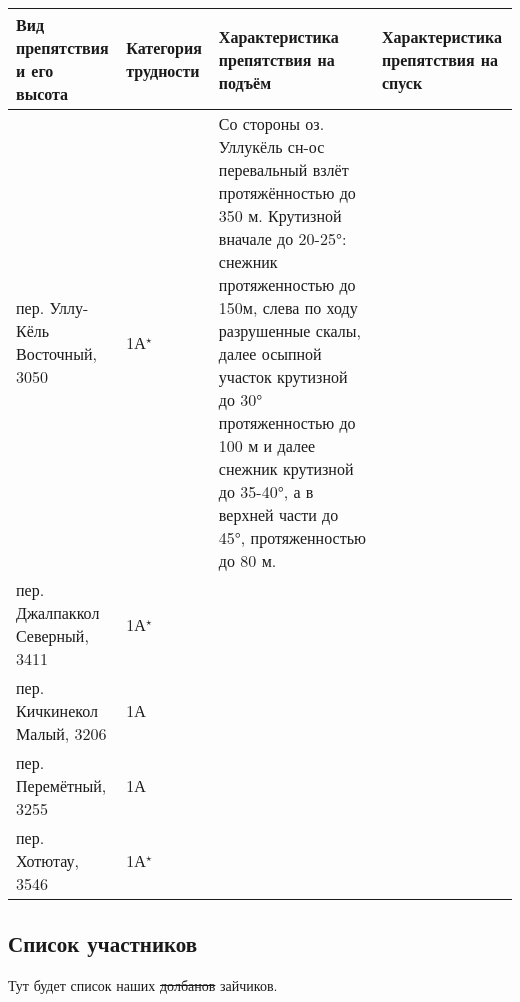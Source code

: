 \begin{table}[h!]
		\begin{tabularx}{\textwidth}{|Y|Y|Y|Y|}
			\hline
			\textbf{Вид препятствия и его высота} &
			\textbf{Категория трудности} &
			\textbf{Характеристика препятствия на подъём} &
			\textbf{Характеристика препятствия на спуск} \\
			\hline			
			пер. Уллу-Кёль Восточный, 3050 & 1А$^{\star}$ &  Со стороны оз. Уллукёль сн-ос перевальный взлёт протяжённостью до 350 м. Крутизной вначале до 20-25°: снежник протяженностью до 150м, слева по ходу разрушенные скалы, далее осыпной участок крутизной до 30° протяженностью до 100 м и далее снежник крутизной до 35-40°, а в верхней части до 45°, протяженностью до 80 м. & \\
			\hline			
			пер. Джалпаккол Северный, 3411  & 1А$^{\star}$ & & \\
			\hline
			пер. Кичкинекол Малый, 3206  & 1А & & \\
			\hline
			пер. Перемётный, 3255  & 1А & & \\
			\hline
			пер. Хотютау, 3546  & 1А$^{\star}$ & & \\
			\hline
%
		\end{tabularx}%
\end{table}

\subsection{Список участников} 
Тут будет список наших \sout{долбанов} зайчиков.
\newpage